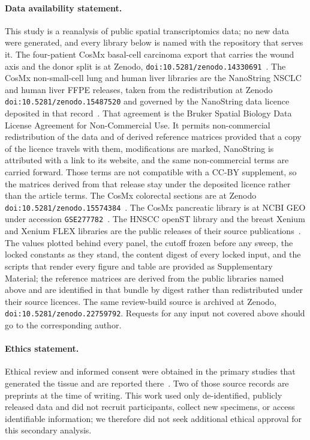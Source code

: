 \paragraph{Data availability statement.}
This study is a reanalysis of public spatial transcriptomics data; no new data were
generated, and every library below is named with the repository that serves it. The
four-patient CosMx basal-cell carcinoma export that carries the wound axis and the donor
split is at Zenodo, \texttt{doi:10.5281/zenodo.14330691}~\citep{Andreatta2024zenodo,Yerly2022,Yerly2025preprint}. The CosMx
non-small-cell lung and human liver libraries are the NanoString NSCLC and human liver
FFPE releases, taken from the redistribution at Zenodo
\texttt{doi:10.5281/zenodo.15487520} and governed by the NanoString data licence
deposited in that record~\citep{He2022,Sun2025spatial}. That agreement is the Bruker
Spatial Biology Data License Agreement for Non-Commercial Use. It permits non-commercial
redistribution of the data and of derived reference matrices provided that a copy of the
licence travels with them, modifications are marked, NanoString is attributed with a link
to its website, and the same non-commercial terms are carried forward. Those terms are not
compatible with a CC-BY supplement, so the matrices derived from that release stay under
the deposited licence rather than the article terms. The CosMx colorectal sections are
at Zenodo \texttt{doi:10.5281/zenodo.15574384}~\citep{Crowell2025preprint}. The CosMx
pancreatic library is at NCBI GEO under accession
\texttt{GSE277782}~\citep{Pei2025}. The HNSCC openST library and the breast Xenium and
Xenium FLEX libraries are the public releases of their source
publications~\citep{Schott2024,Janesick2023}. The values plotted behind every panel, the
cutoff frozen before any sweep, the locked constants as they stand, the content digest of every locked input, and the
scripts that render every figure and table are provided as Supplementary Material; the
reference matrices are derived from the public libraries named above and are
identified in that bundle by digest rather than redistributed under their source
licences. The same review-build source is archived at Zenodo,
\texttt{doi:10.5281/zenodo.22759792}. Requests for any input not covered above should go
to the corresponding author.

\paragraph{Ethics statement.}
Ethical review and informed consent were obtained in the primary studies that generated
the tissue and are reported there~\citep{Yerly2022,Yerly2025preprint,He2022,Janesick2023,Schott2024,Crowell2025preprint,Pei2025}.
Two of those source records are preprints at the time of writing. This work used only
de-identified, publicly released data and did not recruit participants, collect new
specimens, or access identifiable information; we therefore did not seek additional
ethical approval for this secondary analysis.

